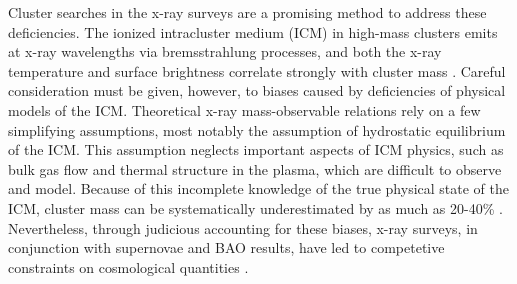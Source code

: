 

Cluster searches in the x-ray surveys are a promising method 
to address these deficiencies.
The ionized intracluster medium (ICM) in high-mass clusters
emits at x-ray wavelengths via bremsstrahlung processes, 
and both the x-ray temperature and surface brightness correlate 
strongly with cluster mass \citep{Kravtsov06}.
Careful consideration must be given, however, to biases 
caused by deficiencies of physical models of the ICM.  Theoretical x-ray
mass-observable relations rely on a few simplifying assumptions, most notably
the assumption of hydrostatic equilibrium of the ICM.  This assumption
neglects important aspects of ICM physics, such as bulk gas flow
and thermal structure in the plasma, which are difficult to observe and 
model.  Because of this incomplete knowledge of the true physical 
state of the ICM, cluster mass can be systematically 
underestimated by as much as 20-40\% \citep{Rasia06,Nagai07,Jeltema08}.
Nevertheless, through judicious accounting for these biases, 
x-ray surveys, in conjunction with supernovae and BAO results, 
have led to competetive constraints on cosmological quantities 
\citep[e.g.][]{Vikhlinin09a,Vikhlinin09b}.